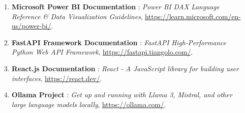 \documentclass[12pt,a4paper,oneside]{report}
\begin{document}
\begin{enumerate}
    \item \textbf{Microsoft Power BI Documentation} : \textit{Power BI DAX Language Reference \& Data Visualization Guidelines}, \url{https://learn.microsoft.com/en-us/power-bi/}.
    \item \textbf{FastAPI Framework Documentation} : \textit{FastAPI High-Performance Python Web API Framework}, \url{https://fastapi.tiangolo.com/}.
    \item \textbf{React.js Documentation} : \textit{React - A JavaScript library for building user interfaces}, \url{https://react.dev/}.
    \item \textbf{Ollama Project} : \textit{Get up and running with Llama 3, Mistral, and other large language models locally}, \url{https://ollama.com/}.
\end{enumerate}
\end{document}

